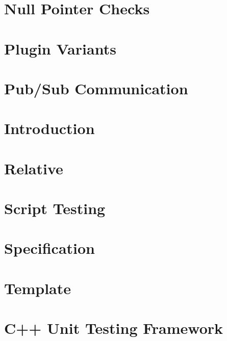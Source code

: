 \documentclass[twoside]{book}
\newcommand{\+}{\discretionary{\mbox{\scriptsize$\hookleftarrow$}}{}{}}
\begin{document}
\chapter{Null Pointer Checks}
\label{doc_decisions_null_pointer_checks_md}
\hypertarget{doc_decisions_null_pointer_checks_md}{}

\chapter{Plugin Variants}
\label{doc_decisions_plugin_variants_md}
\hypertarget{doc_decisions_plugin_variants_md}{}

\chapter{Pub/\+Sub Communication}
\label{doc_decisions_pubsub_md}
\hypertarget{doc_decisions_pubsub_md}{}

\chapter{Introduction}
\label{doc_decisions_README_md}
\hypertarget{doc_decisions_README_md}{}

\chapter{Relative}
\label{doc_decisions_relative_md}
\hypertarget{doc_decisions_relative_md}{}

\chapter{Script Testing}
\label{doc_decisions_script_testing_md}
\hypertarget{doc_decisions_script_testing_md}{}

\chapter{Specification}
\label{doc_decisions_specification_md}
\hypertarget{doc_decisions_specification_md}{}

\chapter{Template}
\label{doc_decisions_template_md}
\hypertarget{doc_decisions_template_md}{}

\chapter{C++ Unit Testing Framework}
\label{doc_decisions_unit_testing_md}
\hypertarget{doc_decisions_unit_testing_md}{}

\end{document}
